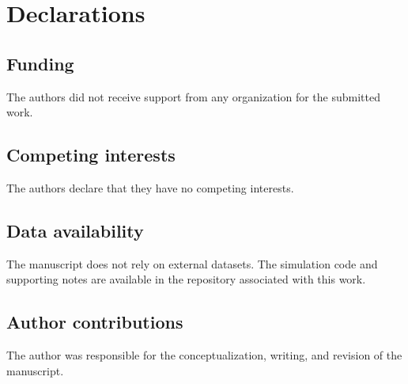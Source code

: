 \documentclass[smallextended]{svjour3}
\begin{document}
\section*{Declarations}
\subsection*{Funding}
The authors did not receive support from any organization for the submitted work.

\subsection*{Competing interests}
The authors declare that they have no competing interests.

\subsection*{Data availability}
The manuscript does not rely on external datasets. The simulation code and supporting notes are available in the repository associated with this work.

\subsection*{Author contributions}
The author was responsible for the conceptualization, writing, and revision of the manuscript.
\end{document}

